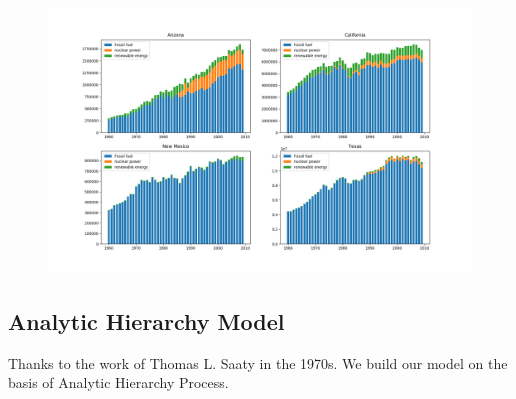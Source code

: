 \documentclass{mcmthesis}
\begin{document}
\begin{itemize}
   \begin{figure}[htbp]
    \centering
    \includegraphics[width=\textwidth]{figures//figure3.jpg}
  \end{figure}
\end{itemize} 

\subsection{Analytic Hierarchy Model}
Thanks to the work of Thomas L. Saaty in the 1970s\cite{TLS}. We build our model on the basis of Analytic Hierarchy Process.
\end{document}
